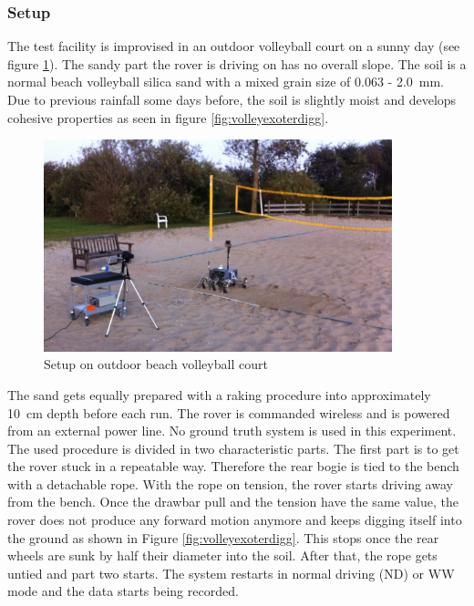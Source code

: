 \documentclass[a4paper,twocolumn]{esapub2005} %
\begin{document}
\subsubsection{Setup} The test facility is improvised in an outdoor volleyball
court on a sunny day (see figure \ref{fig:volley}). The sandy part the rover
is driving on has no overall slope. The soil is a normal beach volleyball
silica sand with a mixed grain size of 0.063 - 2.0~\unit{mm}. Due to previous rainfall
some days before, the soil is slightly moist and develops cohesive properties
as seen in figure \ref{fig:volleyexoterdigg}. 

\begin{figure}[h!]
    \centering
    \includegraphics[width=0.9\textwidth]{volley.jpg}
    \caption{Setup on outdoor beach volleyball court}
    \label{fig:volley}
\end{figure}



The sand gets equally prepared with a raking procedure into approximately
10~\unit{cm} depth before each run.  The rover is commanded wireless
and is powered from an external power line. No ground truth system is used in this experiment. The
used procedure is divided in two characteristic parts. The first part is to get
the rover stuck in a repeatable way. Therefore the rear bogie is tied to the
bench with a detachable rope. With the rope on tension, the rover starts
driving away from the bench. Once the drawbar pull and the tension have the
same value, the rover does not produce any forward motion anymore and keeps
digging itself into the ground as shown in Figure \ref{fig:volleyexoterdigg}.
This stops once the rear wheels are sunk by half their diameter into the soil.
After that, the rope gets untied and part two starts. The system restarts in
normal driving (ND) or WW mode and the data starts being recorded. 
\end{document}
